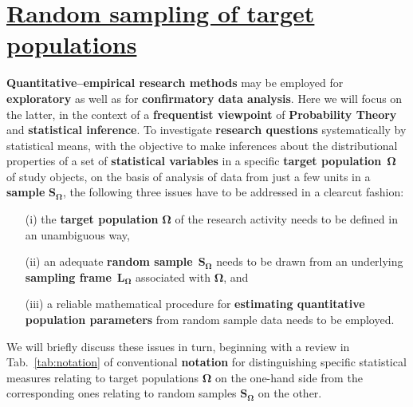 \chapter[Random sampling of target populations]{\href{https://www.youtube.com/watch?v=ApHx0GE3zQI}{Random sampling of target populations}}
\textbf{Quantitative--empirical research methods} may be employed
for \textbf{exploratory} as well as for \textbf{confirmatory data
analysis}. Here we will focus on the latter, in the context of a
\textbf{frequentist viewpoint} of \textbf{Probability Theory} and
\textbf{statistical inference}. To investigate \textbf{research
questions} systematically by statistical means, with the objective
to make inferences about the distributional properties of a set of
\textbf{statistical variables} in a specific \textbf{target 
population}~$\boldsymbol{\Omega}$ of study objects, on the basis 
of analysis of data from just a few units in a \textbf{sample} 
$\boldsymbol{S_{\Omega}}$, the following three issues have to be 
addressed in a clearcut fashion:
%
\begin{itemize}
\item[(i)] the \textbf{target population} $\boldsymbol{\Omega}$ of 
the research activity needs to be defined in an unambiguous way,

\item[(ii)] an adequate \textbf{random 
sample}~$\boldsymbol{S_{\Omega}}$ needs to be drawn from an 
underlying \textbf{sampling frame}~$\boldsymbol{L_{\Omega}}$ 
associated with $\boldsymbol{\Omega}$, and

\item[(iii)] a reliable mathematical procedure for
\textbf{estimating quantitative population parameters} from random
sample data needs to be employed.
\end{itemize}
%
We will briefly discuss these issues in turn, beginning with a 
review in Tab.~\ref{tab:notation} of conventional \textbf{notation} 
for distinguishing specific statistical measures relating to target
populations $\boldsymbol{\Omega}$ on the one-hand side from the 
corresponding ones relating to random samples 
$\boldsymbol{S_{\Omega}}$ on the other.
%
